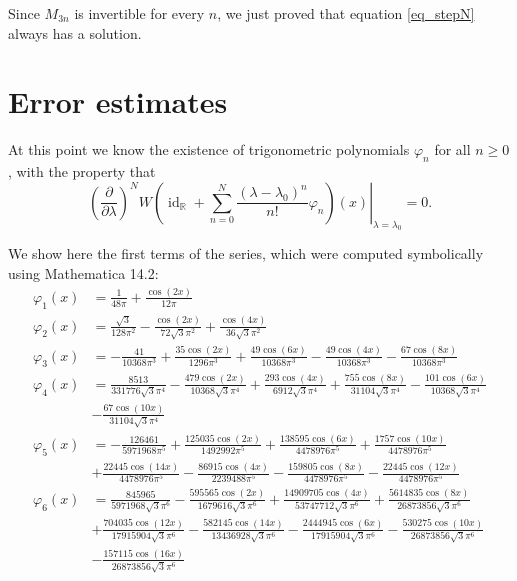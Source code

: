 \documentclass{amsart}
\def \R{\mathbb R}
\def \id{\operatorname{id}}
\begin{document}
Since $M_{3n}$ is invertible for every $n$, we just proved that equation \eqref{eq_stepN} always has a solution.

\section{Error estimates}
\label{sec_error_estimates}
At this point we know the existence of trigonometric polynomials $\varphi_n$ for all $n \geq 0$, with the property that
\[
	\left. \left( \frac\partial{\partial \lambda}\right)^N W\left(\id_\R + \sum_{n=0}^N \frac {(\lambda-\lambda_0)^n}{n!} \varphi_n\right)(x) \right|_{\lambda=\lambda_0} = 0.
\]

We show here the first terms of the series, which were computed symbolically using Mathematica 14.2:
\begin{align}
	\varphi _1(x) &= \frac{1}{48 \pi } + \frac{\cos (2 x)}{12 \pi } \\
 \varphi _2(x) &= \frac{\sqrt{3}}{128 \pi ^2} -\frac{\cos (2 x)}{72 \sqrt{3} \pi ^2}+\frac{\cos (4 x)}{36 \sqrt{3} \pi ^2} \\
 \varphi _3(x) &= -\frac{41}{10368 \pi ^3} + \frac{35 \cos (2 x)}{1296 \pi ^3}+\frac{49 \cos (6 x)}{10368 \pi ^3}-\frac{49 \cos (4 x)}{10368 \pi ^3}-\frac{67 \cos (8 x)}{10368 \pi ^3}\\
 \varphi _4(x) &= \frac{8513}{331776 \sqrt{3} \pi ^4} -\frac{479 \cos (2 x)}{10368 \sqrt{3} \pi ^4}+\frac{293 \cos (4 x)}{6912 \sqrt{3} \pi ^4}+\frac{755 \cos (8 x)}{31104 \sqrt{3} \pi ^4}-\frac{101 \cos (6 x)}{10368 \sqrt{3} \pi ^4}\\& -\frac{67 \cos (10 x)}{31104 \sqrt{3} \pi ^4} \\
 \varphi _5(x) &= -\frac{126461}{5971968 \pi ^5} + \frac{125035 \cos (2 x)}{1492992 \pi ^5}+\frac{138595 \cos (6 x)}{4478976 \pi ^5}+\frac{1757 \cos (10 x)}{4478976 \pi ^5}\\& +\frac{22445 \cos (14 x)}{4478976 \pi ^5} -\frac{86915 \cos (4 x)}{2239488 \pi ^5}-\frac{159805 \cos (8 x)}{4478976 \pi ^5}-\frac{22445 \cos (12 x)}{4478976 \pi ^5} \\
 \varphi _6(x) &=\frac{845965}{5971968 \sqrt{3} \pi ^6} -\frac{595565 \cos (2 x)}{1679616 \sqrt{3} \pi ^6}+\frac{14909705 \cos (4 x)}{53747712 \sqrt{3} \pi ^6}+\frac{5614835 \cos (8 x)}{26873856 \sqrt{3} \pi ^6}\\& +\frac{704035 \cos (12 x)}{17915904 \sqrt{3} \pi ^6} -\frac{582145 \cos (14 x)}{13436928 \sqrt{3} \pi ^6}-\frac{2444945 \cos (6 x)}{17915904 \sqrt{3} \pi ^6}-\frac{530275 \cos (10 x)}{26873856 \sqrt{3} \pi ^6}\\& -\frac{157115 \cos (16 x)}{26873856 \sqrt{3} \pi ^6} \\
\end{align}
\end{document}
